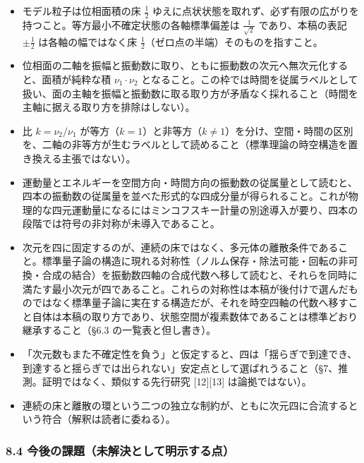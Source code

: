 \documentclass[
]{ltjsarticle}
\providecommand{\tightlist}{%
  \setlength{\itemsep}{0pt}\setlength{\parskip}{0pt}}
\begin{document}
\begin{itemize}
\tightlist
\item
  モデル粒子は位相面積の床 \(\tfrac12\)
  ゆえに点状状態を取れず、必ず有限の広がりを持つこと。等方最小不確定状態の各軸標準偏差は
  \(\tfrac{1}{\sqrt2}\) であり、本稿の表記 \(\pm\tfrac12\)
  は各軸の幅ではなく床 \(\tfrac12\)（ゼロ点の半端）そのものを指すこと。
\item
  位相面の二軸を振幅と振動数に取り、ともに振動数の次元へ無次元化すると、面積が純粋な積
  \(\nu_1\cdot\nu_2\)
  となること。この枠では時間を従属ラベルとして扱い、面の主軸を振幅と振動数に取る取り方が矛盾なく採れること（時間を主軸に据える取り方を排除はしない）。
\item
  比 \(k=\nu_2/\nu_1\)
  が等方（\(k=1\)）と非等方（\(k\neq1\)）を分け、空間・時間の区別を、二軸の非等方が生むラベルとして読めること（標準理論の時空構造を置き換える主張ではない）。
\item
  運動量とエネルギーを空間方向・時間方向の振動数の従属量として読むと、四本の振動数の従属量を並べた形式的な四成分量が得られること。これが物理的な四元運動量になるにはミンコフスキー計量の別途導入が要り、四本の段階では符号の非対称が未導入であること。
\item
  次元を四に固定するのが、連続の床ではなく、多元体の離散条件であること。標準量子論の構造に現れる対称性（ノルム保存・除法可能・回転の非可換・合成の結合）を振動数四軸の合成代数へ移して読むと、それらを同時に満たす最小次元が四であること。これらの対称性は本稿が後付けで選んだものではなく標準量子論に実在する構造だが、それを時空四軸の代数へ移すこと自体は本稿の取り方であり、状態空間が複素数体であることは標準どおり継承すること（§6.3
  の一覧表と但し書き）。
\item
  「次元数もまた不確定性を負う」と仮定すると、四は「揺らぎで到達でき、到達すると揺らぎでは出られない」安定点として選ばれうること（§7、推測。証明ではなく、類似する先行研究
  {[}12{]}{[}13{]} は論拠ではない）。
\item
  連続の床と離散の環という二つの独立な制約が、ともに次元四に合流するという符合（解釈は読者に委ねる）。
\end{itemize}

\subsubsection{8.4
今後の課題（未解決として明示する点）}\label{ux4ecaux5f8cux306eux8ab2ux984cux672aux89e3ux6c7aux3068ux3057ux3066ux660eux793aux3059ux308bux70b9}
\end{document}
